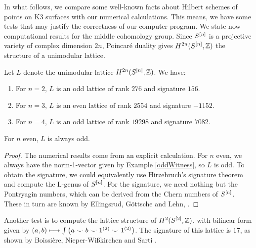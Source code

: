In what follows, we compare some well-known facts about Hilbert schemes of points on K3 surfaces with our numerical calculations. This means, we have some tests that may justify the correctness of our computer program.
We state now computational results for the middle cohomology group. Since $S^{[n]}$ is a projective variety of complex dimension $2n$, Poincar\'{e} duality gives $H^{2n}(S^{[n]},\mathbb{Z})$ the structure of a unimodular lattice.  
\begin{proposition} Let $L$ denote the unimodular lattice $H^{2n}(S^{[n]},\mathbb{Z})$. We have:
\begin{enumerate}
\item For $n=2$, $L$ is an odd lattice of rank $276$ and signature $156$.
\item For $n=3$, $L$ is an even lattice of rank $2554$ and signature $-1152$.
\item For $n=4$, $L$ is an odd lattice of rank $19298$ and signature $7082$.
\end{enumerate}
For $n$ even, $L$ is always odd. 
\end{proposition} 
\begin{proof}The numerical results come from an explicit calculation. For $n$ even, we always have the norm-1-vector given by Example \ref{oddWitness}, so $L$ is odd. To obtain the signature, we could equivalently use Hirzebruch's signature theorem and compute the L-genus of $S^{[n]}$. For the signature, we need nothing but the Pontryagin numbers, which can be derived from the Chern numbers of $S^{[n]}$. These in turn are known by Ellingsrud, G\"ottsche and Lehn, \cite[Rem. 5.5]{EGL}. 
\end{proof}
Another test is to compute the lattice structure of $H^2(S^{[2]},\mathbb{Z})$, with bilinear form given by $(a,b)\longmapsto \int \left(a\smile b\smile 1^{(2)}\smile 1^{(2)}\right)$. The signature of this lattice is $17$, as shown by Boissi\`ere, Nieper-Wi{\ss}kirchen and Sarti \cite[Lemma 6.9]{BNS}.

